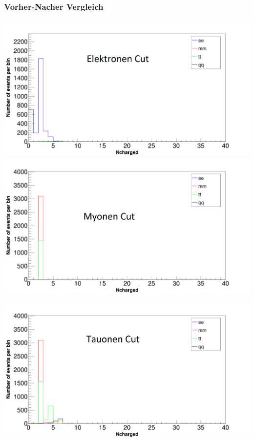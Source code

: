 \begin{frame}
	\frametitle{Vorher-Nacher Vergleich}
	\begin{minipage}{0.48\linewidth}
			\includegraphics[width=1.1\linewidth]{graphics/Ncharged_vergleich_ee}\\
			\includegraphics[width=1.1\linewidth]{graphics/Ncharged_vergleich_mm}
	\end{minipage}
	\begin{minipage}{0.48\linewidth}
			\includegraphics[width=1.1\linewidth]{graphics/Ncharged_vergleich_tt}\\

\end{minipage}
\end{frame}
